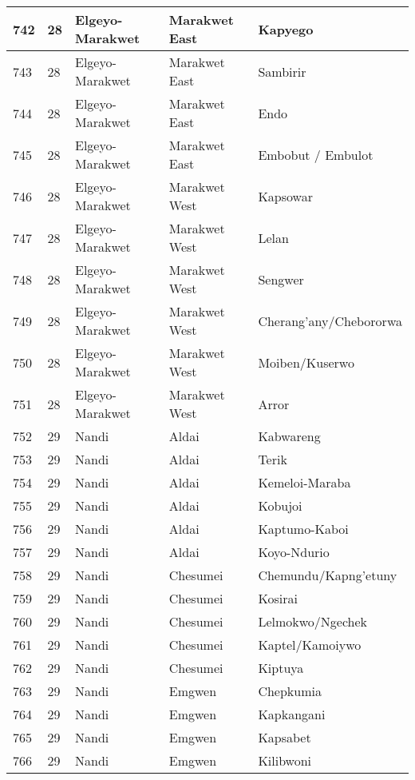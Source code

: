 \begin{table}[!ht]
\begin{tabular}{|l|l|l|l|l|}
        742 & 28 & Elgeyo-Marakwet & Marakwet East & Kapyego \\ \hline
        743 & 28 & Elgeyo-Marakwet & Marakwet East & Sambirir \\ \hline
        744 & 28 & Elgeyo-Marakwet & Marakwet East & Endo \\ \hline
        745 & 28 & Elgeyo-Marakwet & Marakwet East & Embobut / Embulot \\ \hline
        746 & 28 & Elgeyo-Marakwet & Marakwet West & Kapsowar \\ \hline
        747 & 28 & Elgeyo-Marakwet & Marakwet West & Lelan \\ \hline
        748 & 28 & Elgeyo-Marakwet & Marakwet West & Sengwer \\ \hline
        749 & 28 & Elgeyo-Marakwet & Marakwet West & Cherang’any/Chebororwa \\ \hline
        750 & 28 & Elgeyo-Marakwet & Marakwet West & Moiben/Kuserwo \\ \hline
        751 & 28 & Elgeyo-Marakwet & Marakwet West & Arror \\ \hline
        752 & 29 & Nandi & Aldai & Kabwareng \\ \hline
        753 & 29 & Nandi & Aldai & Terik \\ \hline
        754 & 29 & Nandi & Aldai & Kemeloi-Maraba \\ \hline
        755 & 29 & Nandi & Aldai & Kobujoi \\ \hline
        756 & 29 & Nandi & Aldai & Kaptumo-Kaboi \\ \hline
        757 & 29 & Nandi & Aldai & Koyo-Ndurio \\ \hline
        758 & 29 & Nandi & Chesumei & Chemundu/Kapng’etuny \\ \hline
        759 & 29 & Nandi & Chesumei & Kosirai \\ \hline
        760 & 29 & Nandi & Chesumei & Lelmokwo/Ngechek \\ \hline
        761 & 29 & Nandi & Chesumei & Kaptel/Kamoiywo \\ \hline
        762 & 29 & Nandi & Chesumei & Kiptuya \\ \hline
        763 & 29 & Nandi & Emgwen & Chepkumia \\ \hline
        764 & 29 & Nandi & Emgwen & Kapkangani \\ \hline
        765 & 29 & Nandi & Emgwen & Kapsabet \\ \hline
        766 & 29 & Nandi & Emgwen & Kilibwoni \\ \hline

\end{tabular}
\end{table}
